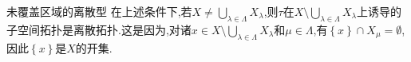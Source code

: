 \begin{remark}{未覆盖区域的离散型}{}
	在上述条件下,若$X\neq\bigcup\limits_{\lambda\in\Lambda}X_{\lambda}$,则$\tau$在$X\setminus\bigcup\limits_{\lambda\in\Lambda}X_{\lambda}$上诱导的子空间拓扑是离散拓扑.这是因为,对诸$x\in X\setminus\bigcup\limits_{\lambda\in\Lambda}X_{\lambda}$和$\mu\in\Lambda$,有$\left\{x\right\}\cap X_{\mu}=\emptyset$,因此$\left\{x\right\}$是$X$的开集.
\end{remark}























